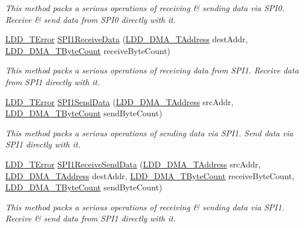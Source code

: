 \begin{DoxyCompactItemize}
\begin{DoxyCompactList}\small\item\em This method packs a serious operations of receiving \& sending data via S\-P\-I0. Receive \& send data from S\-P\-I0 directly with it. \end{DoxyCompactList}\item 
\hyperlink{group___p_e___types__module_ga24c2b045fd04e79e85f261ce4df35588}{L\-D\-D\-\_\-\-T\-Error} \hyperlink{group___s_p_i___operation_gafff5a1858e4723dcf27c15da6221be2a}{S\-P\-I1\-Receive\-Data} (\hyperlink{group___p_e___types__module_gab8287f62db7ff96992355760b652cd07}{L\-D\-D\-\_\-\-D\-M\-A\-\_\-\-T\-Address} dest\-Addr, \hyperlink{group___p_e___types__module_gac001a681eb67942fa78ac9b62ba3b0d6}{L\-D\-D\-\_\-\-D\-M\-A\-\_\-\-T\-Byte\-Count} receive\-Byte\-Count)
\begin{DoxyCompactList}\small\item\em This method packs a serious operations of receiving data from S\-P\-I1. Receive data from S\-P\-I1 directly with it. \end{DoxyCompactList}\item 
\hyperlink{group___p_e___types__module_ga24c2b045fd04e79e85f261ce4df35588}{L\-D\-D\-\_\-\-T\-Error} \hyperlink{group___s_p_i___operation_gabfd38bd5dd8b9142f74bb8f457d2105f}{S\-P\-I1\-Send\-Data} (\hyperlink{group___p_e___types__module_gab8287f62db7ff96992355760b652cd07}{L\-D\-D\-\_\-\-D\-M\-A\-\_\-\-T\-Address} src\-Addr, \hyperlink{group___p_e___types__module_gac001a681eb67942fa78ac9b62ba3b0d6}{L\-D\-D\-\_\-\-D\-M\-A\-\_\-\-T\-Byte\-Count} send\-Byte\-Count)
\begin{DoxyCompactList}\small\item\em This method packs a serious operations of sending data via S\-P\-I1. Send data via S\-P\-I1 directly with it. \end{DoxyCompactList}\item 
\hyperlink{group___p_e___types__module_ga24c2b045fd04e79e85f261ce4df35588}{L\-D\-D\-\_\-\-T\-Error} \hyperlink{group___s_p_i___operation_gaa5f377e0c22b59a379b04f910cec62ee}{S\-P\-I1\-Receive\-Send\-Data} (\hyperlink{group___p_e___types__module_gab8287f62db7ff96992355760b652cd07}{L\-D\-D\-\_\-\-D\-M\-A\-\_\-\-T\-Address} src\-Addr, \hyperlink{group___p_e___types__module_gab8287f62db7ff96992355760b652cd07}{L\-D\-D\-\_\-\-D\-M\-A\-\_\-\-T\-Address} dest\-Addr, \hyperlink{group___p_e___types__module_gac001a681eb67942fa78ac9b62ba3b0d6}{L\-D\-D\-\_\-\-D\-M\-A\-\_\-\-T\-Byte\-Count} receive\-Byte\-Count, \hyperlink{group___p_e___types__module_gac001a681eb67942fa78ac9b62ba3b0d6}{L\-D\-D\-\_\-\-D\-M\-A\-\_\-\-T\-Byte\-Count} send\-Byte\-Count)
\begin{DoxyCompactList}\small\item\em This method packs a serious operations of receiving \& sending data via S\-P\-I1. Receive \& send data from S\-P\-I1 directly with it. \end{DoxyCompactList}\end{DoxyCompactItemize}


